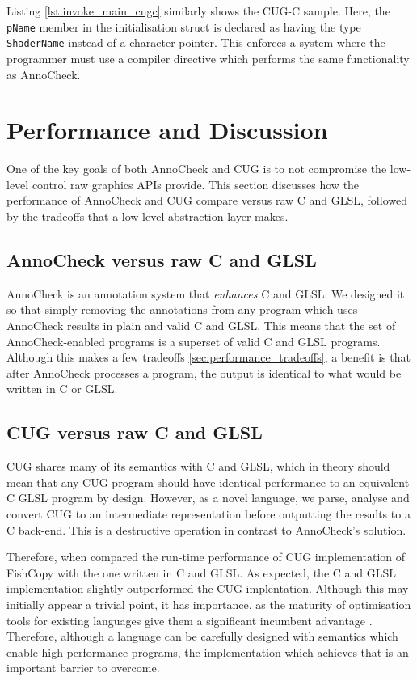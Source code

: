\documentclass[a4paper,12pt,twoside,openright]{report}
\begin{document}
Listing \ref{lst:invoke_main_cugc} similarly shows the CUG-C sample. Here, the
\texttt{pName} member in the initialisation struct is declared as having the
type \texttt{ShaderName} instead of a character pointer. This enforces a system
where the programmer must use a compiler directive which performs the same
functionality as AnnoCheck.

\section{Performance and Discussion}

One of the key goals of both AnnoCheck and CUG is to not compromise the
low-level control raw graphics APIs provide. This section discusses how the
performance of AnnoCheck and CUG compare versus raw C and GLSL, followed by the
tradeoffs that a low-level abstraction layer makes.

\subsection{AnnoCheck versus raw C and GLSL}

AnnoCheck is an annotation system that \textit{enhances} C and GLSL. We
designed it so that simply removing the annotations from any program which uses
AnnoCheck results in plain and valid C and GLSL. This means that the set of
AnnoCheck-enabled programs is a superset of valid C and GLSL programs. Although
this makes a few tradeoffs \ref{sec:performance_tradeoffs}, a benefit is that
after AnnoCheck processes a program, the output is identical to what would be
written in C or GLSL.


\subsection{CUG versus raw C and GLSL}

CUG shares many of its semantics with C and GLSL, which in theory should mean
that any CUG program should have identical performance to an equivalent C GLSL
program by design. However, as a novel language, we parse, analyse and convert
CUG to an intermediate representation before outputting the results to a C
back-end. This is a destructive operation in contrast to AnnoCheck's solution.

Therefore, when compared the run-time performance of CUG implementation of
FishCopy with the one written in C and GLSL. As expected, the C and GLSL
implementation slightly outperformed the CUG implentation. Although this may
initially appear a trivial point, it has importance, as the maturity of
optimisation tools for existing languages give them a significant incumbent
advantage \cite{RustSlow}. Therefore, although a language can be carefully
designed with semantics which enable high-performance programs, the
implementation which achieves that is an important barrier to overcome.
\end{document}
